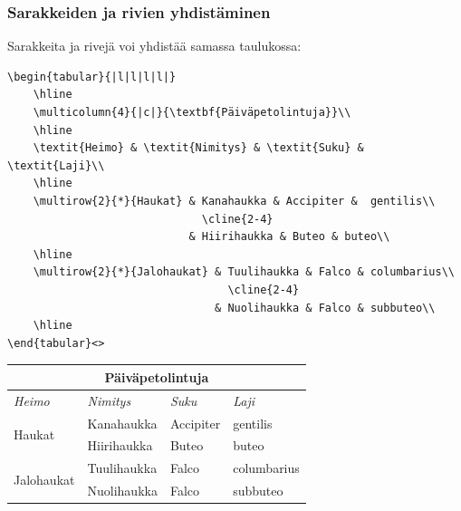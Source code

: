 \begin{fframe}
    \frametitle{Sarakkeiden ja rivien yhdistäminen} 
    Sarakkeita ja rivejä voi yhdistää samassa taulukossa:
    \begin{lstlisting}[basicstyle=\ttfamily\scriptsize]
\begin{tabular}{|l|l|l|l|}
    \hline
    \multicolumn{4}{|c|}{\textbf{Päiväpetolintuja}}\\
    \hline
    \textit{Heimo} & \textit{Nimitys} & \textit{Suku} & \textit{Laji}\\
    \hline
    \multirow{2}{*}{Haukat} & Kanahaukka & Accipiter &  gentilis\\
                              \cline{2-4}
                            & Hiirihaukka & Buteo & buteo\\
    \hline
    \multirow{2}{*}{Jalohaukat} & Tuulihaukka & Falco & columbarius\\
                                  \cline{2-4}
                                & Nuolihaukka & Falco & subbuteo\\
    \hline
\end{tabular}<>
    \end{lstlisting}
    \begin{table}
        \begin{serif}
            \begin{scriptsize}
                \begin{tabular}{|l|l|l|l|}
                    \hline
                    \multicolumn{4}{|c|}{\textbf{Päiväpetolintuja}}\\
                    \hline
                    \textit{Heimo} & \textit{Nimitys} & \textit{Suku} & \textit{Laji}\\\hline
                    \multirow{2}{*}{Haukat} & Kanahaukka & Accipiter &  gentilis\\ \cline{2-4}
                                            & Hiirihaukka & Buteo & buteo\\ \hline
                    \multirow{2}{*}{Jalohaukat} & Tuulihaukka & Falco & columbarius\\ \cline{2-4}
                                                &Nuolihaukka & Falco & subbuteo\\ \hline
                \end{tabular}
            \end{scriptsize}
        \end{serif}
    \end{table}
\end{fframe}

